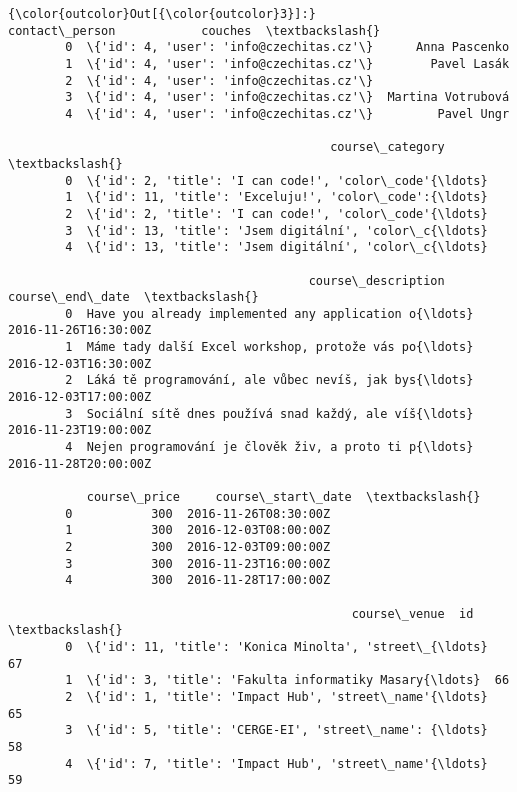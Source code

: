 \documentclass[11pt]{article}
\begin{document}
\begin{Verbatim}[commandchars=\\\{\}]
{\color{outcolor}Out[{\color{outcolor}3}]:}                            contact\_person            couches  \textbackslash{}
        0  \{'id': 4, 'user': 'info@czechitas.cz'\}      Anna Pascenko   
        1  \{'id': 4, 'user': 'info@czechitas.cz'\}        Pavel Lasák   
        2  \{'id': 4, 'user': 'info@czechitas.cz'\}                      
        3  \{'id': 4, 'user': 'info@czechitas.cz'\}  Martina Votrubová   
        4  \{'id': 4, 'user': 'info@czechitas.cz'\}         Pavel Ungr   
        
                                             course\_category  \textbackslash{}
        0  \{'id': 2, 'title': 'I can code!', 'color\_code'{\ldots}   
        1  \{'id': 11, 'title': 'Exceluju!', 'color\_code':{\ldots}   
        2  \{'id': 2, 'title': 'I can code!', 'color\_code'{\ldots}   
        3  \{'id': 13, 'title': 'Jsem digitální', 'color\_c{\ldots}   
        4  \{'id': 13, 'title': 'Jsem digitální', 'color\_c{\ldots}   
        
                                          course\_description       course\_end\_date  \textbackslash{}
        0  Have you already implemented any application o{\ldots}  2016-11-26T16:30:00Z   
        1  Máme tady další Excel workshop, protože vás po{\ldots}  2016-12-03T16:30:00Z   
        2  Láká tě programování, ale vůbec nevíš, jak bys{\ldots}  2016-12-03T17:00:00Z   
        3  Sociální sítě dnes používá snad každý, ale víš{\ldots}  2016-11-23T19:00:00Z   
        4  Nejen programování je člověk živ, a proto ti p{\ldots}  2016-11-28T20:00:00Z   
        
           course\_price     course\_start\_date  \textbackslash{}
        0           300  2016-11-26T08:30:00Z   
        1           300  2016-12-03T08:00:00Z   
        2           300  2016-12-03T09:00:00Z   
        3           300  2016-11-23T16:00:00Z   
        4           300  2016-11-28T17:00:00Z   
        
                                                course\_venue  id  \textbackslash{}
        0  \{'id': 11, 'title': 'Konica Minolta', 'street\_{\ldots}  67   
        1  \{'id': 3, 'title': 'Fakulta informatiky Masary{\ldots}  66   
        2  \{'id': 1, 'title': 'Impact Hub', 'street\_name'{\ldots}  65   
        3  \{'id': 5, 'title': 'CERGE-EI', 'street\_name': {\ldots}  58   
        4  \{'id': 7, 'title': 'Impact Hub', 'street\_name'{\ldots}  59   
        

\end{Verbatim}
\end{document}
